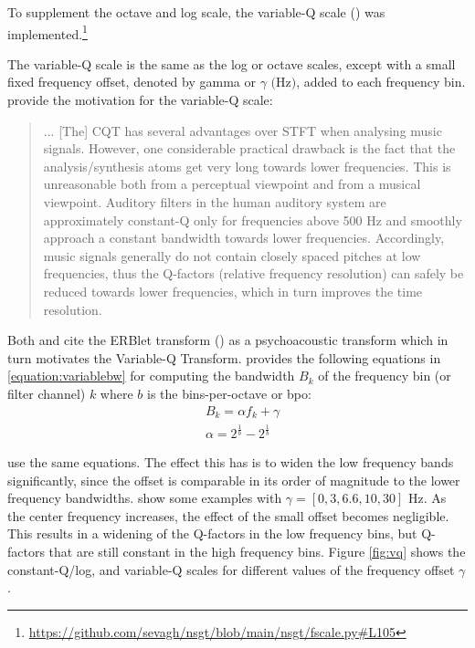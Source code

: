 \documentclass[report.tex]{subfiles}
\begin{document}
To supplement the octave and log scale, the variable-Q scale (\cite{variableq1, variableq2}) was implemented.\footnote{\url{https://github.com/sevagh/nsgt/blob/main/nsgt/fscale.py\#L105}}

The variable-Q scale is the same as the log or octave scales, except with a small fixed frequency offset, denoted by gamma or $\gamma \text{ (Hz)}$, added to each frequency bin. \textcite{variableq1} provide the motivation for the variable-Q scale:
\begin{quote}
	... [The] CQT has several advantages over STFT when analysing music signals. However, one considerable practical drawback is the fact that the analysis/synthesis atoms get very long towards lower frequencies. This is unreasonable both from a perceptual viewpoint and from a musical viewpoint. Auditory filters in the human auditory system are approximately constant-Q only for frequencies above 500 Hz and smoothly approach a constant bandwidth towards lower frequencies. Accordingly, music signals generally do not contain closely spaced pitches at low frequencies, thus the Q-factors (relative frequency resolution) can safely be reduced towards lower frequencies, which in turn improves the time resolution.
\end{quote}

Both \textcite{variableq1} and \textcite{variableq2} cite the ERBlet transform (\cite{erblet}) as a psychoacoustic transform which in turn motivates the Variable-Q Transform. \textcite{variableq1} provides the following equations in \ref{equation:variablebw} for computing the bandwidth $B_{k}$ of the frequency bin (or filter channel) $k$ where $b$ is the bins-per-octave or bpo:
\begin{align}\tag{5}\label{equation:variablebw}
	\nonumber & B_{k} = \alpha f_{k} + \gamma\\
	\nonumber & \alpha = 2^{\frac{1}{b}} - 2^{\frac{1}{b}}
\end{align}

\textcite{variableq2} use the same equations. The effect this has is to widen the low frequency bands significantly, since the offset is comparable in its order of magnitude to the lower frequency bandwidths. \textcite{variableq1} show some examples with $\gamma = [0, 3, 6.6, 10, 30] \text{ Hz}$. As the center frequency increases, the effect of the small offset becomes negligible. This results in a widening of the Q-factors in the low frequency bins, but Q-factors that are still constant in the high frequency bins. Figure \ref{fig:vq} shows the constant-Q/log, and variable-Q scales for different values of the frequency offset $\gamma$.
\end{document}
